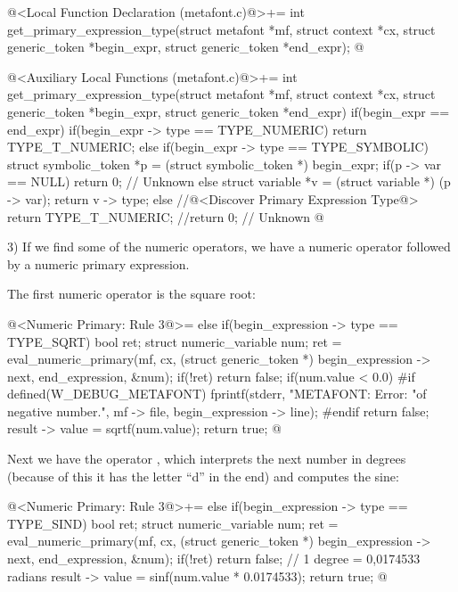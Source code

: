 \iniciocodigo
@<Local Function Declaration (metafont.c)@>+=
int get_primary_expression_type(struct metafont *mf, struct context *cx,
                               struct generic_token *begin_expr,
                               struct generic_token *end_expr);
@
\fimcodigo

\iniciocodigo
@<Auxiliary Local Functions (metafont.c)@>+=
int get_primary_expression_type(struct metafont *mf, struct context *cx,
                               struct generic_token *begin_expr,
                               struct generic_token *end_expr){
  if(begin_expr == end_expr){
    if(begin_expr -> type == TYPE_NUMERIC)
      return TYPE_T_NUMERIC;
    else if(begin_expr -> type == TYPE_SYMBOLIC){
      struct symbolic_token *p = (struct symbolic_token *) begin_expr;
      if(p -> var == NULL)
        return 0; // Unknown
      else{
        struct variable *v = (struct variable *) (p -> var);
        return v -> type;
      }
    }
  }
  else{
    //@<Discover Primary Expression Type@>
  }
  return TYPE_T_NUMERIC;
  //return 0; // Unknown
}
@
\fimcodigo

3) If we find some of the numeric operators, we have a numeric
operator followed by a numeric primary expression.

The first numeric operator is the square root:

\iniciocodigo
@<Numeric Primary: Rule 3@>=
else if(begin_expression -> type == TYPE_SQRT){
  bool ret;
  struct numeric_variable num;
  ret = eval_numeric_primary(mf, cx, (struct generic_token *)
                             begin_expression -> next,
                             end_expression, &num);
  if(!ret)
    return false;
  if(num.value < 0.0){
#if defined(W_DEBUG_METAFONT)
    fprintf(stderr, "METAFONT: Error: %
            "of negative number.\n", mf -> file,
            begin_expression -> line);
#endif
    return false;
  }
  result -> value = sqrtf(num.value);
  return true;
}
@
\fimcodigo

Next we have the operator , which interprets the next
number in degrees (because of this it has the letter ``d'' in the end)
and computes the sine:

\iniciocodigo
@<Numeric Primary: Rule 3@>+=
else if(begin_expression -> type == TYPE_SIND){
  bool ret;
  struct numeric_variable num;
  ret = eval_numeric_primary(mf, cx, (struct generic_token *)
                             begin_expression -> next,
                             end_expression, &num);
  if(!ret)
    return false;
  // 1 degree = 0,0174533 radians
  result -> value = sinf(num.value * 0.0174533);
  return true;
}
@
\fimcodigo

